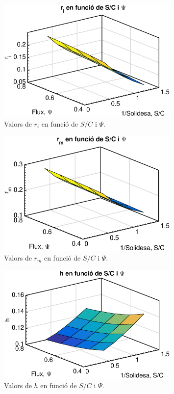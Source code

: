 \begin{figure}[H]
	\centering
	\includegraphics[width=0.8\textwidth]{./code/figures/parametres/ri}
	\caption{Valors de $r_i$ en funció de $S/C$ i $\Psi$.}
	\label{ri}
\end{figure}


\begin{figure}[H]
	\centering
	\includegraphics[width=0.8\textwidth]{./code/figures/parametres/rm}
	\caption{Valors de $r_m$ en funció de $S/C$ i $\Psi$.}
	\label{rm}
\end{figure}

\begin{figure}[H]
	\centering
	\includegraphics[width=0.8\textwidth]{./code/figures/parametres/h}
	\caption{Valors de $h$ en funció de $S/C$ i $\Psi$.}
	\label{h}
\end{figure}

